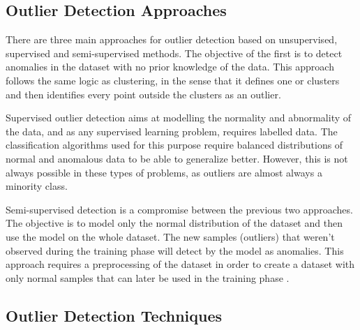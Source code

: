 \subsection{Outlier Detection Approaches}
There are three main approaches for outlier detection based on unsupervised, supervised and semi-supervised methods. The objective of the first is to detect anomalies in the dataset with no prior knowledge of the data. This approach follows the same logic as clustering, in the sense that it defines one or clusters and then identifies every point outside the clusters as an outlier.

Supervised outlier detection aims at modelling the normality and abnormality of the data, and as any supervised learning problem, requires labelled data. The classification algorithms used for this purpose require balanced distributions of normal and anomalous data to be able to generalize better. However, this is not always possible in these types of problems, as outliers are almost always a minority class.

Semi-supervised detection is a compromise between the previous two approaches. The objective is to model only the normal distribution of the dataset and then use the model on the whole dataset. The new samples (outliers) that weren't observed during the training phase will detect by the model as anomalies. This approach requires a preprocessing of the dataset in order to create a dataset with only normal samples that can later be used in the training phase \cite{hodge.austin_SurveyOutlierDetection_2004}.


\subsection{Outlier Detection Techniques}
